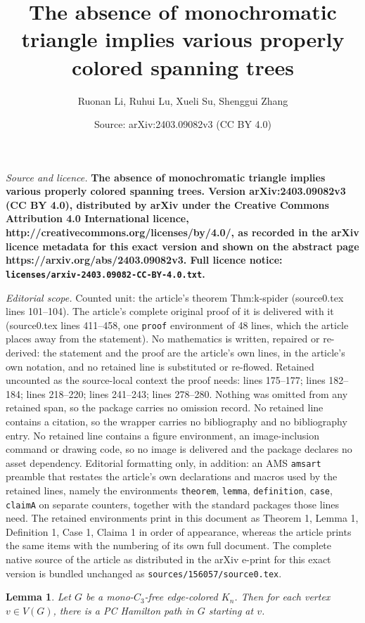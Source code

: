 \documentclass[10pt,a4paper]{amsart}
\title{\Large \bf The absence of monochromatic triangle implies various properly colored spanning trees}
\author{Ruonan Li, Ruhui Lu, Xueli Su, Shenggui Zhang}
\date{Source: arXiv:2403.09082v3 (CC BY 4.0)}
\newtheorem{lemma}{Lemma}
\begin{document}
\maketitle

\noindent\emph{Source and licence.} \Large \bf The absence of monochromatic triangle implies various properly colored spanning trees. Version arXiv:2403.09082v3 (CC BY 4.0), distributed by arXiv under the Creative Commons Attribution 4.0 International licence, http://creativecommons.org/licenses/by/4.0/, as recorded in the arXiv licence metadata for this exact version and shown on the abstract page https://arxiv.org/abs/2403.09082v3. Full licence notice: \texttt{licenses/arxiv-2403.09082-CC-BY-4.0.txt}.\par\smallskip

\noindent\textit{Editorial scope.} Counted unit: the article's theorem Thm:k-spider (source0.tex lines 101--104). The article's complete original proof of it is delivered with it (source0.tex lines 411--458, one \texttt{proof} environment of 48 lines, which the article places away from the statement). No mathematics is written, repaired or re-derived: the statement and the proof are the article's own lines, in the article's own notation, and no retained line is substituted or re-flowed.  Retained uncounted as the source-local context the proof needs: lines 175--177; lines 182--184; lines 218--220; lines 241--243; lines 278--280.  Nothing was omitted from any retained span, so the package carries no omission record.  No retained line contains a citation, so the wrapper carries no bibliography and no bibliography entry.  No retained line contains a figure environment, an image-inclusion command or drawing code, so no image is delivered and the package declares no asset dependency.  Editorial formatting only, in addition: an AMS \texttt{amsart} preamble that restates the article's own declarations and macros used by the retained lines, namely the environments \texttt{theorem}, \texttt{lemma}, \texttt{definition}, \texttt{case}, \texttt{claimA} on separate counters, together with the standard packages those lines need.  The retained environments print in this document as Theorem 1, Lemma 1, Definition 1, Case 1, Claima 1 in order of appearance, whereas the article prints the same items with the numbering of its own full document.  The complete native source of the article as distributed in the arXiv e-print for this exact version is bundled unchanged as \texttt{sources/156057/source0.tex}.
\begin{lemma}\label{Lem:STAR}
    Let $G$ be a mono-$C_3$-free edge-colored $K_n$. Then for each vertex $v\in V(G)$, there is a PC Hamilton path in $G$ starting at $v$.
\end{lemma}
\end{document}

